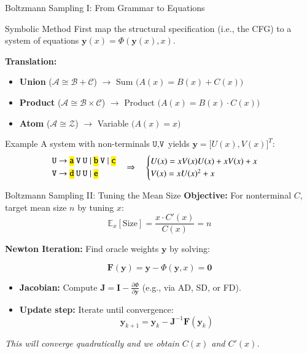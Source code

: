 \documentclass{beamer}
\newcommand{\codett}[1]{\texttt{\hl{#1}}}
\newcommand{\nt}[1]{\texttt{#1}}      %
\newcommand{\tok}[1]{\codett{#1}}     %
\begin{document}
\begin{frame}{Boltzmann Sampling I: From Grammar to Equations}
  \begin{block}{Symbolic Method}
    First map the structural specification (i.e., the CFG) to a system of equations $\mathbf{y}(x) = \Phi(\mathbf{y}(x), x)$.

    \vspace{0.5em}
    \textbf{Translation:}
    \begin{itemize}
      \item \textbf{Union} ($\mathcal{A} \cong \mathcal{B} + \mathcal{C}$) $\to$ Sum $\big(A(x) = B(x) + C(x)\big)$
      \item \textbf{Product} ($\mathcal{A} \cong \mathcal{B} \times \mathcal{C}$) $\to$ Product $\big(A(x) = B(x) \cdot C(x)\big)$
      \item \textbf{Atom} ($\mathcal{A} \cong \mathcal{Z}$) $\to$ Variable $\big(A(x) = x\big)$
    \end{itemize}
  \end{block}

  \begin{block}{Example}
    A system with non-terminals $\nt{U}, \nt{V}$ yields $\mathbf{y} = \big[U(x), V(x)\big]^T$:
    $$
    \begin{aligned}
      &\nt{U} \to \tok{a} ~ \nt{V} ~ \nt{U} \mid \tok{b} ~ \nt{V} \mid \tok{c} \\
      &\nt{V} \to \tok{d} ~ \nt{U} ~ \nt{U} \mid \tok{e}
    \end{aligned}
    \quad \Rightarrow \quad
    \begin{cases}
      U(x) = x V(x) U(x) + x V(x) + x \\
      V(x) = x U(x)^2 + x
    \end{cases}
    $$
  \end{block}
\end{frame}

\begin{frame}{Boltzmann Sampling II: Tuning the Mean Size}
  \textbf{Objective:} For nonterminal $C$, target mean size $n$ by tuning $x$:
  $$ \mathbb{E}_x[\text{Size}] = \frac{x \cdot C'(x)}{C(x)} = n $$

  \textbf{Newton Iteration:}
  Find oracle weights $\mathbf{y}$ by solving:

  $$\mathbf{F}(\mathbf{y}) = \mathbf{y} - \Phi(\mathbf{y}, x) = \mathbf{0}$$

  \begin{itemize}
    \item \textbf{Jacobian:} Compute $\mathbf{J} = \mathbf{I} - \frac{\partial \Phi}{\partial \mathbf{y}}$ (e.g., via AD, SD, or FD).
    \item \textbf{Update step:} Iterate until convergence:
    $$ \mathbf{y}_{k+1} = \mathbf{y}_k - \mathbf{J}^{-1} \mathbf{F}(\mathbf{y}_k) $$
  \end{itemize}

  \vspace{0.5em}
  \textit{This will converge quadratically and we obtain $C(x)$ and $C'(x)$.}
\end{frame}
\end{document}
